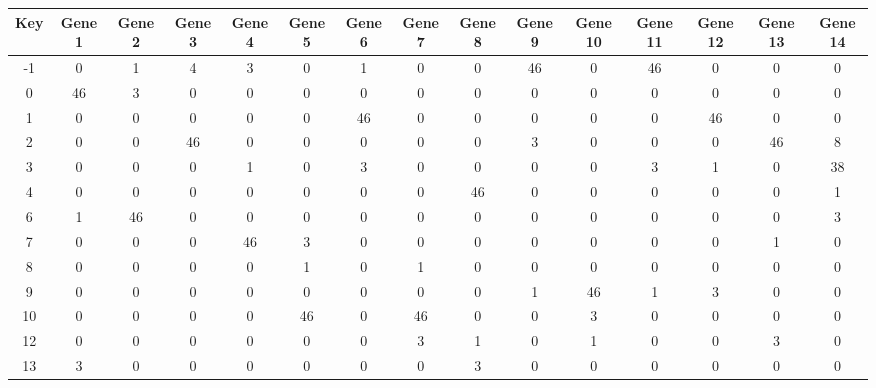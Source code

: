 \begin{tabular}{|c|c|c|c|c|c|c|c|c|c|c|c|c|c|c|}
\hline
Key & Gene 1 & Gene 2 & Gene 3 & Gene 4 & Gene 5 & Gene 6 & Gene 7 & Gene 8 & Gene 9 & Gene 10 & Gene 11 & Gene 12 & Gene 13 & Gene 14 \\
\hline
-1 & 0 & 1 & 4 & 3 & 0 & 1 & 0 & 0 & 46 & 0 & 46 & 0 & 0 & 0 \\
0 & 46 & 3 & 0 & 0 & 0 & 0 & 0 & 0 & 0 & 0 & 0 & 0 & 0 & 0 \\
1 & 0 & 0 & 0 & 0 & 0 & 46 & 0 & 0 & 0 & 0 & 0 & 46 & 0 & 0 \\
2 & 0 & 0 & 46 & 0 & 0 & 0 & 0 & 0 & 3 & 0 & 0 & 0 & 46 & 8 \\
3 & 0 & 0 & 0 & 1 & 0 & 3 & 0 & 0 & 0 & 0 & 3 & 1 & 0 & 38 \\
4 & 0 & 0 & 0 & 0 & 0 & 0 & 0 & 46 & 0 & 0 & 0 & 0 & 0 & 1 \\
6 & 1 & 46 & 0 & 0 & 0 & 0 & 0 & 0 & 0 & 0 & 0 & 0 & 0 & 3 \\
7 & 0 & 0 & 0 & 46 & 3 & 0 & 0 & 0 & 0 & 0 & 0 & 0 & 1 & 0 \\
8 & 0 & 0 & 0 & 0 & 1 & 0 & 1 & 0 & 0 & 0 & 0 & 0 & 0 & 0 \\
9 & 0 & 0 & 0 & 0 & 0 & 0 & 0 & 0 & 1 & 46 & 1 & 3 & 0 & 0 \\
10 & 0 & 0 & 0 & 0 & 46 & 0 & 46 & 0 & 0 & 3 & 0 & 0 & 0 & 0 \\
12 & 0 & 0 & 0 & 0 & 0 & 0 & 3 & 1 & 0 & 1 & 0 & 0 & 3 & 0 \\
13 & 3 & 0 & 0 & 0 & 0 & 0 & 0 & 3 & 0 & 0 & 0 & 0 & 0 & 0 \\
\hline
\end{tabular}